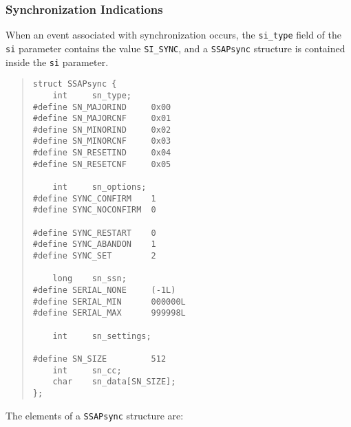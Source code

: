 \subsubsection	{Synchronization Indications}
When an event associated with synchronization occurs,
the \verb"si_type" field of the \verb"si" parameter contains the value
\verb"SI_SYNC",
and a \verb"SSAPsync" structure is contained inside the \verb"si" parameter.
\begin{quote}\small\begin{verbatim}
struct SSAPsync {
    int     sn_type;
#define SN_MAJORIND     0x00
#define SN_MAJORCNF     0x01
#define SN_MINORIND     0x02
#define SN_MINORCNF     0x03
#define SN_RESETIND     0x04
#define SN_RESETCNF     0x05

    int     sn_options;
#define SYNC_CONFIRM    1
#define SYNC_NOCONFIRM  0

#define SYNC_RESTART    0
#define SYNC_ABANDON    1
#define SYNC_SET        2

    long    sn_ssn;
#define SERIAL_NONE     (-1L)
#define SERIAL_MIN      000000L
#define SERIAL_MAX      999998L

    int     sn_settings;

#define SN_SIZE         512
    int     sn_cc;
    char    sn_data[SN_SIZE];
};
\end{verbatim}\end{quote}
The elements of a \verb"SSAPsync" structure are:
